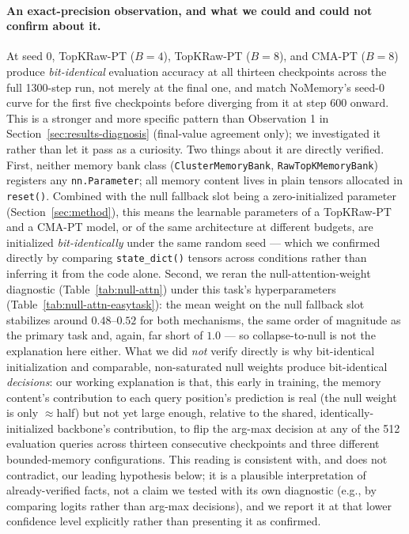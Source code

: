 \documentclass[11pt]{article}
\begin{document}
\paragraph{An exact-precision observation, and what we could and could not confirm about it.}
At seed 0, TopKRaw-PT ($B{=}4$), TopKRaw-PT ($B{=}8$), and CMA-PT ($B{=}8$) produce
\emph{bit-identical} evaluation accuracy at all thirteen checkpoints across the full 1300-step
run, not merely at the final one, and match NoMemory's seed-0 curve for the first five checkpoints
before diverging from it at step 600 onward. This is a stronger and more specific pattern than
Observation 1 in Section~\ref{sec:results-diagnosis} (final-value agreement only); we investigated
it rather than let it pass as a curiosity. Two things about it are directly verified. First,
neither memory bank class (\texttt{ClusterMemoryBank}, \texttt{RawTopKMemoryBank}) registers any
\texttt{nn.Parameter}; all memory content lives in plain tensors allocated in \texttt{reset()}.
Combined with the null fallback slot being a zero-initialized parameter (Section~\ref{sec:method}),
this means the learnable parameters of a TopKRaw-PT and a CMA-PT model, or of the same
architecture at different budgets, are initialized \emph{bit-identically} under the same random
seed --- which we confirmed directly by comparing \texttt{state\_dict()} tensors across
conditions rather than inferring it from the code alone. Second, we reran the null-attention-weight
diagnostic (Table~\ref{tab:null-attn}) under this task's hyperparameters
(Table~\ref{tab:null-attn-easytask}): the mean weight on the null fallback slot stabilizes around
$0.48$--$0.52$ for both mechanisms, the same order of magnitude as the primary task and, again, far
short of $1.0$ --- so collapse-to-null is not the explanation here either. What we did
\emph{not} verify directly is why bit-identical initialization and comparable, non-saturated null
weights produce bit-identical \emph{decisions}: our working explanation is that, this early in
training, the memory content's contribution to each query position's prediction is real (the null
weight is only $\approx$half) but not yet large enough, relative to the shared,
identically-initialized backbone's contribution, to flip the arg-max decision at any of the 512
evaluation queries across thirteen consecutive checkpoints and three different bounded-memory
configurations. This reading is consistent with, and does not contradict, our leading hypothesis
below; it is a plausible interpretation of already-verified facts, not a claim we tested with its
own diagnostic (e.g., by comparing logits rather than arg-max decisions), and we report it at that
lower confidence level explicitly rather than presenting it as confirmed.
\end{document}
